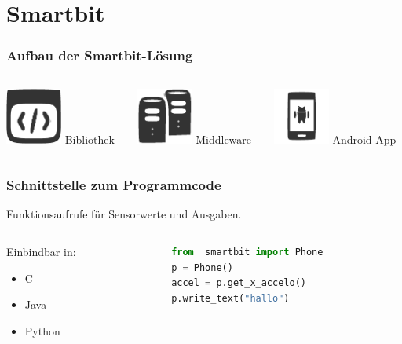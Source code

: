 \documentclass{beamer}
\begin{document}
\section{Smartbit}
\begin{frame}
    \frametitle{Aufbau der Smartbit-Lösung}
    \begin{columns}
        \begin{column}{0.3\textwidth}
            \centering
            \includegraphics[width=5em]{images/lib.pdf}
            Bibliothek
        \end{column}
        \begin{column}{0.3\textwidth}
            \centering
            \includegraphics[width=5em]{images/server.pdf}
            Middleware
        \end{column}
        \begin{column}{0.3\textwidth}
            \centering
            \includegraphics[width=5em]{images/android.pdf}
            Android-App
        \end{column}
    \end{columns}
\end{frame}

\begin{frame}[fragile]
    \frametitle{Schnittstelle zum Programmcode}
    Funktionsaufrufe für Sensorwerte und Ausgaben.
    \begin{columns}
        \begin{column}{0.3\textwidth}
            Einbindbar in:
            \begin{itemize}
                \item C
                \item Java
                \item Python
            \end{itemize}
        \end{column}
        \begin{column}{0.6\textwidth}
            \begin{lstlisting}[language=python]
from  smartbit import Phone
p = Phone()
accel = p.get_x_accelo()
p.write_text("hallo")
            \end{lstlisting}
        \end{column}
    \end{columns}
    
   
\end{frame}
\end{document}
